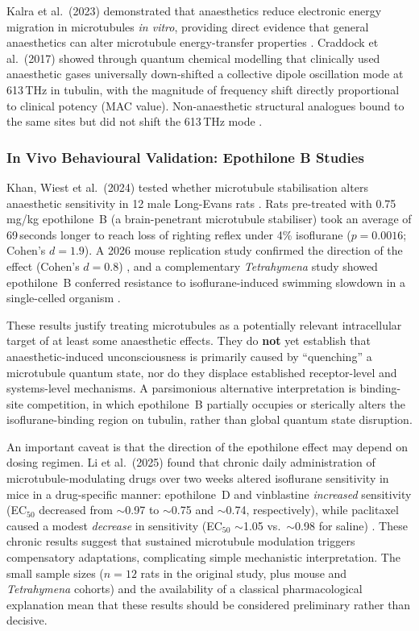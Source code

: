 \documentclass[10pt, a4paper, twocolumn]{article}
\begin{document}
Kalra et al.\ (2023) demonstrated that anaesthetics reduce electronic
energy migration in microtubules \emph{in vitro}, providing direct
evidence that general anaesthetics can alter microtubule energy-transfer
properties \cite{kalra2023}. Craddock et al.\ (2017) showed through
quantum chemical modelling that clinically used anaesthetic gases
universally down-shifted a collective dipole oscillation mode at
613\,THz in tubulin, with the magnitude of frequency shift directly
proportional to clinical potency (MAC value). Non-anaesthetic structural
analogues bound to the same sites but did not shift the 613\,THz mode
\cite{craddock2017}.

\subsubsection{In Vivo Behavioural Validation: Epothilone B Studies}

Khan, Wiest et al.\ (2024) tested whether microtubule stabilisation
alters anaesthetic sensitivity in 12 male Long-Evans rats
\cite{khan2024}. Rats pre-treated with 0.75\,mg/kg epothilone~B (a
brain-penetrant microtubule stabiliser) took an average of 69\,seconds
longer to reach loss of righting reflex under 4\% isoflurane
($p = 0.0016$; Cohen's $d = 1.9$). A 2026 mouse replication study
confirmed the direction of the effect (Cohen's $d = 0.8$)
\cite{khan2026mouse}, and a complementary \textit{Tetrahymena} study
showed epothilone~B conferred resistance to isoflurane-induced swimming
slowdown in a single-celled organism \cite{khan2026tetra}.

These results justify treating microtubules as a potentially relevant
intracellular target of at least some anaesthetic effects. They do
\textbf{not} yet establish that anaesthetic-induced unconsciousness is
primarily caused by ``quenching'' a microtubule quantum state, nor do
they displace established receptor-level and systems-level mechanisms.
A parsimonious alternative interpretation is binding-site
competition, in which epothilone~B partially occupies or sterically
alters the isoflurane-binding region on tubulin, rather than global
quantum state disruption.

An important caveat is that the direction of the epothilone effect may
depend on dosing regimen. Li et al.\ (2025) found that chronic daily
administration of microtubule-modulating drugs over two weeks altered
isoflurane sensitivity in mice in a drug-specific manner: epothilone~D
and vinblastine \textit{increased} sensitivity (EC$_{50}$ decreased from
$\sim$0.97 to $\sim$0.75 and $\sim$0.74, respectively), while paclitaxel
caused a modest \textit{decrease} in sensitivity (EC$_{50}$ $\sim$1.05
vs.\ $\sim$0.98 for saline) \cite{li2025chronic}. These chronic results
suggest that sustained microtubule modulation triggers compensatory
adaptations, complicating simple mechanistic interpretation. The small
sample sizes ($n=12$ rats in the original study, plus mouse and
\textit{Tetrahymena} cohorts) and the availability of a classical
pharmacological explanation mean that these results should be considered
preliminary rather than decisive.
\end{document}
